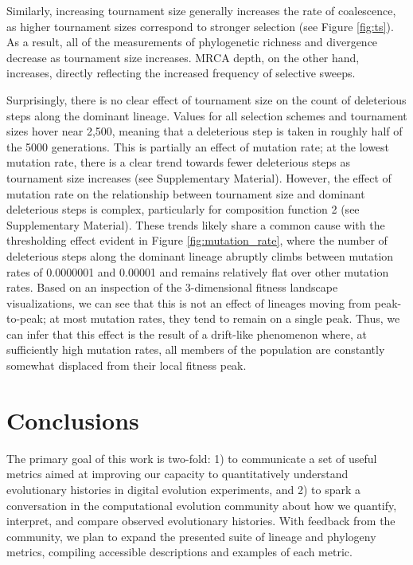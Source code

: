 \documentclass[letterpaper]{article}
\begin{document}
Similarly, increasing tournament size generally increases the rate of coalescence, as higher tournament sizes correspond to stronger selection (see Figure \ref{fig:ts}). As a result, all of the measurements of phylogenetic richness and divergence decrease as tournament size increases. MRCA depth, on the other hand, increases, directly reflecting the increased frequency of selective sweeps. 

Surprisingly, there is no clear effect of tournament size on the count of deleterious steps along the dominant lineage. Values for all selection schemes and tournament sizes hover near 2,500, meaning that a deleterious step is taken in roughly half of the 5000 generations. This is partially an effect of mutation rate; at the lowest mutation rate, there is a clear trend towards fewer deleterious steps as tournament size increases (see Supplementary Material). However, the effect of mutation rate on the relationship between tournament size and dominant deleterious steps is complex, particularly for composition function 2 (see Supplementary Material). These trends likely share a common cause with the thresholding effect evident in Figure \ref{fig:mutation_rate}, where the number of deleterious steps along the dominant lineage abruptly climbs between mutation rates of 0.0000001 and 0.00001 and remains relatively flat over other mutation rates. Based on an inspection of the 3-dimensional fitness landscape visualizations, we can see that this is not an effect of lineages moving from peak-to-peak; at most mutation rates, they tend to remain on a single peak. Thus, we can infer that this effect is the result of a drift-like phenomenon where, at sufficiently high mutation rates, all members of the population are constantly somewhat displaced from their local fitness peak.


\section{Conclusions}


The primary goal of this work is two-fold: 1) to communicate a set of useful metrics aimed at improving our capacity to quantitatively understand evolutionary histories in digital evolution experiments, and 2) to spark a conversation in the computational evolution community about how we quantify, interpret, and compare observed evolutionary histories. With feedback from the community, we plan to expand the presented suite of lineage and phylogeny metrics, compiling accessible descriptions and examples of each metric. 
\end{document}
